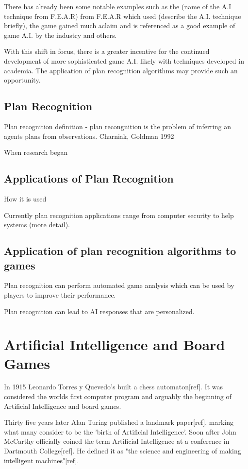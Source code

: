 \documentclass[parskip]{cs4rep}
\begin{document}
There has already been some notable examples such as the (name of the A.I technique from F.E.A.R) from F.E.A.R which used (describe the A.I. technique briefly), the game gained much aclaim and is referenced as a good example of game A.I. by the industry and others.

With this shift in focus, there is a greater incentive for the continued development of more sophisticated game A.I. likely with techniques developed in academia. The application of plan recognition algorithms may provide such an opportunity. 

\subsection{Plan Recognition}

Plan recognition definition - plan recongnition is the problem of inferring an agents plans from observations. Charniak, Goldman 1992

When research began

\subsection{Applications of Plan Recognition}

How it is used

Currently plan recognition applications range from computer security to help systems (more detail).

\subsection{Application of plan recognition algorithms to games}

Plan recognition can perform automated game analysis which can be used by players to improve their performance. 

Plan recognition can lead to AI responses that are personalized.

\section{Artificial Intelligence and Board Games}

In 1915 Leonardo Torres y Quevedo's built a chess automaton[ref]. It was considered the worlds first computer program and arguably the beginning of Artificial Intelligence and board games.

Thirty five years later Alan Turing published a landmark paper[ref], marking what many consider to be the 'birth of Artificial Intelligence'. Soon after John McCarthy officially coined the term Artificial Intelligence at a conference in Dartmouth College[ref]. He defined it as "the science and engineering of making intelligent machines"[ref].
\end{document}

